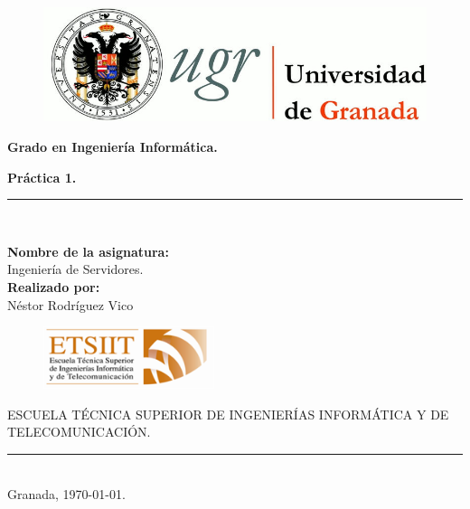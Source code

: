 \documentclass[a4paper,titlepage,12pt]{scrartcl}	%
\numberwithin{figure}{section} %
\numberwithin{table}{section} %
\begin{document}
	\begin{titlepage}
		\begin{center}
			\begin{figure}[htb]
				\begin{center}
					\includegraphics[width=12cm]{./Portada/ugr.png}
				\end{center}
			\end{figure}

			\vspace*{0.8cm}
			\begin{Large}
				\textbf{Grado en Ingeniería Informática.}\\
			\end{Large}
			\begin{Huge}
				\vspace{1.5cm}
				\textbf{Práctica 1.} \\
			\end{Huge}
			\vspace*{0.76cm}
			\rule{100mm}{0.1mm}\\
			\vspace*{0.5cm}
			\begin{large}
				\textbf{Nombre de la asignatura:}\\
				Ingeniería de Servidores.\\
				\vspace*{0.5cm}
				\textbf{Realizado por:}\\
				Néstor Rodríguez Vico \\

				\vspace*{2cm}
				\begin{figure}[htb]
					\begin{center}
						\includegraphics[width=5cm]{./Portada/etsiit.png}
					\end{center}
				\end{figure}
				\vspace*{-0.6cm}
				ESCUELA TÉCNICA SUPERIOR DE INGENIERÍAS INFORMÁTICA Y DE TELECOMUNICACIÓN.\\
				\rule{20mm}{0.1mm}\\
				\vspace*{0.6cm}
				Granada, \today.
			\end{large}
		\end{center}
	\end{titlepage}
	
\end{document}
